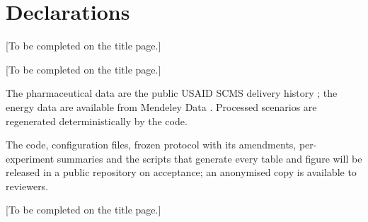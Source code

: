 \documentclass[pdflatex,sn-basic]{sn-jnl}
\begin{document}
\section*{Declarations}

 [To be completed on the title page.]

 [To be completed on the title page.]

 The pharmaceutical data are the public USAID SCMS delivery history
\citep{scmsdata2015}; the energy data are available from Mendeley Data
\citep{optirecdata2025}. Processed scenarios are regenerated deterministically by the code.

 The code, configuration files, frozen protocol with its amendments,
per-experiment summaries and the scripts that generate every table and figure will be released
in a public repository on acceptance; an anonymised copy is available to reviewers.

 [To be completed on the title page.]


\end{document}

